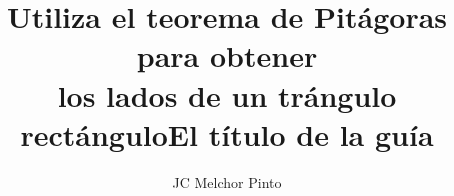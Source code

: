 \documentclass[12pt,addpoints,answers]{guia}
\title{Utiliza el teorema de Pitágoras para obtener \\ los lados de un trángulo rectángulo}
\title{El título de la guía}
\author{JC Melchor Pinto}
\begin{document}
\pagestyle{headandfoot}

\INFO
\printanswers

\begin{multicols}{2}
    
    
\end{multicols}
\begin{questions}
    \questionboxed[10] {}
    \questionboxed[10] {}
    \questionboxed[10] {}
    \questionboxed[10] {}
    \questionboxed[10] {}
    \questionboxed[10] {}
    \questionboxed[10] {}
    \questionboxed[10] {}
    \questionboxed[10] {}
    \questionboxed[10] {}
\end{questions}
\end{document}
